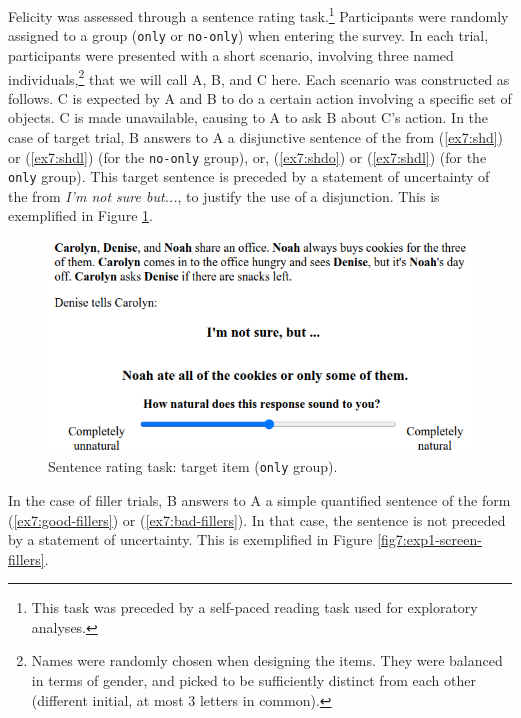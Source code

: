 Felicity was assessed through a sentence rating task.\footnote{This task was preceded by a self-paced reading task used for exploratory analyses.} Participants were randomly assigned to a group (\texttt{only} or \texttt{no-only}) when entering the survey. In each trial, participants were presented with a short scenario, involving three named individuals,\footnote{Names were randomly chosen when designing the items. They were balanced in terms of gender, and picked to be sufficiently distinct from each other (different initial, at most $3$ letters in common).} that we will call A, B, and C here. Each scenario was constructed as follows. C is expected by A and B to do a certain action involving a specific set of objects. C is made unavailable, causing to A to ask B about C's action. In the case of target trial, B answers to A a disjunctive sentence of the from (\ref{ex7:shd}) or (\ref{ex7:shdl}) (for the \texttt{no-only} group), or, (\ref{ex7:shdo}) or (\ref{ex7:shdl}) (for the \texttt{only} group). This target sentence is preceded by a statement of uncertainty of the from \textit{I'm not sure but...}, to justify the use of a disjunction. This is exemplified in Figure \ref{fig7:exp1-screen-target}.

\begin{figure}[H]
	\centering
	\includegraphics[width=.5\linewidth]{./exp1-screen-target.png}
	\caption[]{Sentence rating task: target item (\texttt{only} group).}\label{fig7:exp1-screen-target}
\end{figure}

In the case of filler trials, B answers to A a simple quantified sentence of the form (\ref{ex7:good-fillers}) or  (\ref{ex7:bad-fillers}). In that case, the sentence is not preceded by a statement of uncertainty. This is exemplified in Figure \ref{fig7:exp1-screen-fillers}.

\begin{exe}
	\ex \label{ex7:good-fillers}
	\begin{xlist}
		\label{ex7:good-filler-some}
		\label{ex7:good-filler-all}
	\end{xlist}
	\ex \label{ex7:bad-fillers}
	\begin{xlist}
		\label{ex7:bad-filler-some}
		\label{ex7:bad-filler-all}
	\end{xlist}
	
\end{exe}

